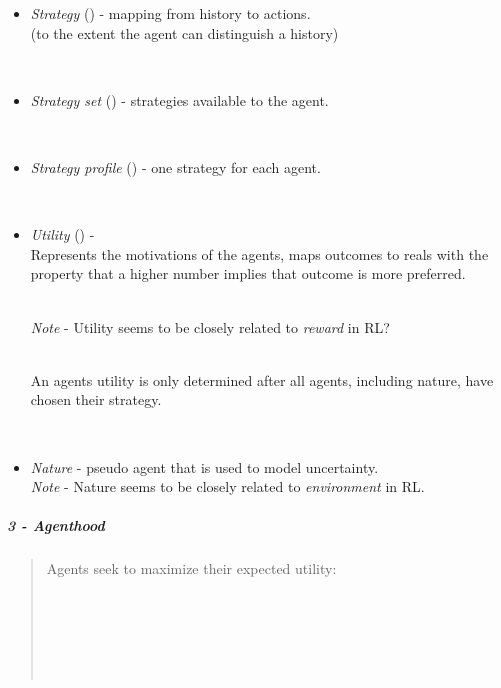 \documentclass[
]{article}
\providecommand{\tightlist}{%
  \setlength{\itemsep}{0pt}\setlength{\parskip}{0pt}}
\begin{document}
\begin{itemize}
\tightlist
\item
  {\emph{Strategy}} ({}) - mapping from history to actions.\\
  {}(to the extent the agent can distinguish a history)\\
  \strut \\
\item
  {\emph{Strategy set}} ({}) - strategies available to the agent.\\
  \strut \\
\item
  {\emph{Strategy profile}} ({}) - one strategy for each agent.\\
  \strut \\
\end{itemize}

\begin{itemize}
\tightlist
\item
  {\emph{Utility}} ({}) -\\
  Represents the motivations of the agents, maps outcomes to reals with
  the property that a higher number implies that outcome is more
  preferred.\\
  \strut \\
  \emph{Note} - Utility seems to be closely related to \emph{reward} in
  RL?\\
  \strut \\
  An agent\textquotesingle s utility is only determined after all
  agents, including nature, have chosen their strategy.\\
  \strut \\
\end{itemize}

\begin{itemize}
\tightlist
\item
  {\emph{Nature}} - pseudo agent that is used to model uncertainty.\\
  \emph{Note} - Nature seems to be closely related to \emph{environment}
  in RL.
\end{itemize}

\subparagraph{3 - Agenthood}\label{agenthood}

\begin{quote}
Agents seek to maximize their expected utility:\\
\strut \\
{}\strut \\
\strut \\
\end{quote}
\end{document}
